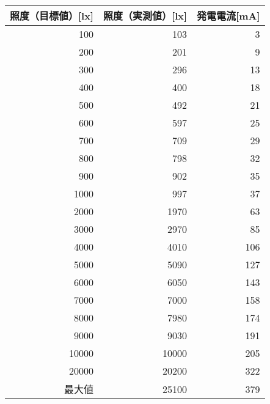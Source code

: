\begin{tabular}{rrr}
\toprule
\multicolumn{1}{c}{照度（目標値）[lx]} & \multicolumn{1}{c}{照度（実測値）[lx]} & \multicolumn{1}{l}{発電電流[mA]} \\
\midrule
100   & 103   & 3 \\
200   & 201   & 9 \\
300   & 296   & 13 \\
400   & 400   & 18 \\
500   & 492   & 21 \\
600   & 597   & 25 \\
700   & 709   & 29 \\
800   & 798   & 32 \\
900   & 902   & 35 \\
1000  & 997   & 37 \\
2000  & 1970  & 63 \\
3000  & 2970  & 85 \\
4000  & 4010  & 106 \\
5000  & 5090  & 127 \\
6000  & 6050  & 143 \\
7000  & 7000  & 158 \\
8000  & 7980  & 174 \\
9000  & 9030  & 191 \\
10000 & 10000 & 205 \\
20000 & 20200 & 322 \\
最大値   & 25100 & 379 \\
\bottomrule
\end{tabular}